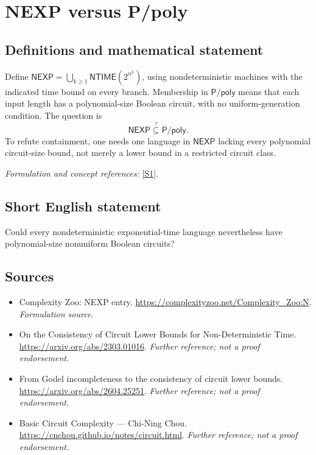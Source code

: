 \documentclass[11pt]{article}
\begin{document}
\section*{\texorpdfstring{NEXP versus P/poly}{NEXP versus P/poly}}\label{63}
\subsection{Definitions and mathematical statement}
Define $\mathsf{NEXP}=\bigcup_{k\ge1}\mathsf{NTIME}(2^{n^k})$, using nondeterministic machines with the indicated time bound on every branch. Membership in $\mathsf{P/poly}$ means that each input length has a polynomial-size Boolean circuit, with no uniform-generation condition. The question is
\[
 \mathsf{NEXP}\stackrel{?}{\subseteq}\mathsf{P/poly}.
\]
To refute containment, one needs one language in $\mathsf{NEXP}$ lacking every polynomial circuit-size bound, not merely a lower bound in a restricted circuit class.
\par\smallskip\textit{Formulation and concept references:} \href{https://complexityzoo.net/Complexity_Zoo:N}{[S1]}.

\subsection{Short English statement}
Could every nondeterministic exponential-time language nevertheless have polynomial-size nonuniform Boolean circuits?
\subsection{Sources}
\begin{itemize}
\item[S1]Complexity Zoo: NEXP entry.
\url{https://complexityzoo.net/Complexity_Zoo:N}.
\textit{Formulation source.}
\item[S2]On the Consistency of Circuit Lower Bounds for Non-Deterministic Time.
\url{https://arxiv.org/abs/2303.01016}.
\textit{Further reference; not a proof endorsement.}
\item[S3]From Godel incompleteness to the consistency of circuit lower bounds.
\url{https://arxiv.org/abs/2604.25251}.
\textit{Further reference; not a proof endorsement.}
\item[S4]Basic Circuit Complexity — Chi-Ning Chou.
\url{https://cnchou.github.io/notes/circuit.html}.
\textit{Further reference; not a proof endorsement.}
\end{itemize}
\end{document}
